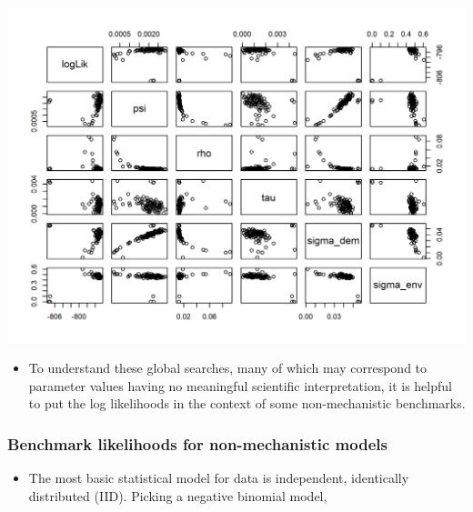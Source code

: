 \documentclass[]{article}
\newenvironment{Shaded}{\begin{snugshade}}{\end{snugshade}}
\newcommand{\KeywordTok}[1]{\textcolor[rgb]{0.13,0.29,0.53}{\textbf{#1}}}
\newcommand{\DataTypeTok}[1]{\textcolor[rgb]{0.13,0.29,0.53}{#1}}
\newcommand{\DecValTok}[1]{\textcolor[rgb]{0.00,0.00,0.81}{#1}}
\newcommand{\StringTok}[1]{\textcolor[rgb]{0.31,0.60,0.02}{#1}}
\newcommand{\OtherTok}[1]{\textcolor[rgb]{0.56,0.35,0.01}{#1}}
\newcommand{\ControlFlowTok}[1]{\textcolor[rgb]{0.13,0.29,0.53}{\textbf{#1}}}
\newcommand{\OperatorTok}[1]{\textcolor[rgb]{0.81,0.36,0.00}{\textbf{#1}}}
\newcommand{\NormalTok}[1]{#1}
\providecommand{\tightlist}{%
  \setlength{\itemsep}{0pt}\setlength{\parskip}{0pt}}
\begin{document}
\begin{center}\includegraphics{figure/sp500-pairs_global-1} \end{center}

\begin{itemize}
\tightlist
\item
  To understand these global searches, many of which may correspond to
  parameter values having no meaningful scientific interpretation, it is
  helpful to put the log likelihoods in the context of some
  non-mechanistic benchmarks.
\end{itemize}

\subsubsection{Benchmark likelihoods for non-mechanistic
models}\label{benchmark-likelihoods-for-non-mechanistic-models}

\begin{itemize}
\tightlist
\item
  The most basic statistical model for data is independent, identically
  distributed (IID). Picking a negative binomial model,
\end{itemize}

\begin{Shaded}
\end{Shaded}
\end{document}
